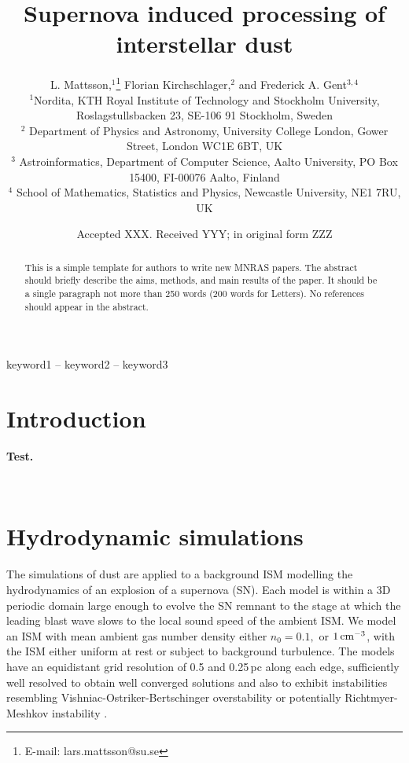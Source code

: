 \documentclass[fleqn,usenatbib]{mnras}
\title[Supernova induced processing of interstellar dust]{Supernova induced processing of interstellar dust}
\author[L. Mattsson et al.]{
L. Mattsson,$^{1}$\thanks{E-mail: lars.mattsson@su.se}
Florian Kirchschlager,$^{2}$ and
Frederick A. Gent$^{3,4}$
\\
$^{1}$Nordita, KTH Royal Institute of Technology and Stockholm University, Roslagstullsbacken 23, SE-106 91 Stockholm, Sweden\\
$^{2}$
Department
of Physics and Astronomy, University College London, Gower Street, London WC1E 6BT, UK\\
$^{3}$
Astroinformatics, Department of Computer Science, Aalto University, PO Box 15400, FI-00076 Aalto, Finland\\
$^{4}$
    School of Mathematics, Statistics and Physics,
      Newcastle University, NE1 7RU, UK 
}
\date{Accepted XXX. Received YYY; in original form ZZZ}
\newcommand{\fk}[1]{{\bf \textcolor{PineGreen}{#1}}}		%
\def\cmcube{{\,{\rm cm}^{-3}}}
\begin{document}
\label{firstpage}
\pagerange{\pageref{firstpage}--\pageref{lastpage}}
\maketitle

\begin{abstract}
This is a simple template for authors to write new MNRAS papers.
The abstract should briefly describe the aims, methods, and main results of the paper.
It should be a single paragraph not more than 250 words (200 words for Letters).
No references should appear in the abstract.
\end{abstract}

\begin{keywords}
keyword1 -- keyword2 -- keyword3
\end{keywords}



\section{Introduction}
\fk{Test.}

\newpage~
\newpage
 
\section{Hydrodynamic simulations}\label{sect:HD}


  The simulations of dust are applied to a background ISM modelling the 
  hydrodynamics of an explosion of a supernova (SN). 
  Each model is within a 3D periodic domain large enough to evolve the SN
  remnant to the stage at which the leading blast wave slows to the local
  sound speed of the ambient ISM.
  We model an ISM with mean ambient gas number density either $n_0=0.1,$ or
  $1\cmcube$, with the ISM either uniform at rest or subject to background
  turbulence.
  The models have an equidistant grid resolution of 0.5 and 0.25\,pc along each
  edge, sufficiently well resolved to obtain well converged solutions 
  \citep{GMKSH20,GMKS21} and also to exhibit instabilities resembling 
  Vishniac-Ostriker-Bertschinger overstability \citep{Vishniac83,VOB85} or
  potentially Richtmyer-Meshkov instability \citep{Bro02}.
\end{document}
